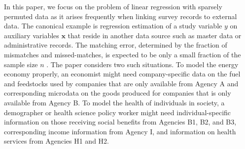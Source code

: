 \documentclass[11pt]{article}
\def\x{\mathbf{x}}
\begin{document}
In this paper, we focus on the problem of linear regression with sparsely permuted data as it arises frequently when linking survey records to external data. The canonical example is regression estimation of a study variable $y$ on auxiliary variables $\x$ that reside in another data source such as master data or administrative records. The matching error, determined by the fraction of mismatches and missed-matches, is expected to be  only a small fraction of the sample size $n$ \cite{Winkler14}. The paper \cite{Scheuren97} considers two such situations. To model the energy economy properly, an economist might need company-specific data on the fuel and feedstocks used by companies that are only available from Agency A and corresponding microdata on the goods produced for companies that is only available from Agency B. To model the health of individuals in society, a demographer or health science policy worker might need individual-specific information on those receiving social benefits from Agencies B1, B2, and B3, corresponding income information from Agency I, and information on health services from Agencies H1 and H2. %
\end{document}
